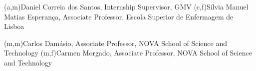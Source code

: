 %
%
%
%
(a,m){Daniel Correia dos Santos, Internship Supervisor, GMV}
(c,f){Sílvia Manuel Matias Esperança, Associate Professor, Escola Superior de Enfermagem de Lisboa}



%
%
%
%
(m,m){Carlos Damásio, Associate Professor, NOVA School of Science and Technology}
(m,f){Carmen Morgado, Associate Professor, NOVA School of Science and Technology}